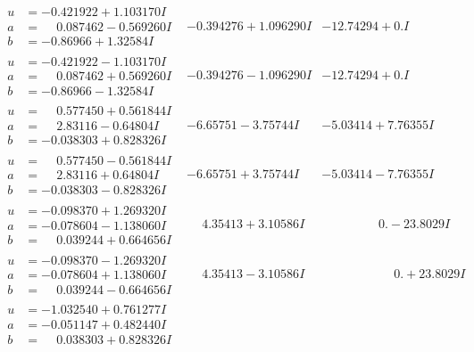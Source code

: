 \documentclass[1p]{elsarticle_modified}
\theoremstyle{definition}
\begin{document}
$$\begin{array}{c|c|c}
\begin{aligned}
u &= -0.421922 + 1.103170 I \\
a &= \phantom{-}0.087462 - 0.569260 I \\
b &= -0.86966 + 1.32584 I\end{aligned}
 & -0.394276 + 1.096290 I & -12.74294 + 0. I\phantom{ +0.000000I} \\ \hline\begin{aligned}
u &= -0.421922 - 1.103170 I \\
a &= \phantom{-}0.087462 + 0.569260 I \\
b &= -0.86966 - 1.32584 I\end{aligned}
 & -0.394276 - 1.096290 I & -12.74294 + 0. I\phantom{ +0.000000I} \\ \hline\begin{aligned}
u &= \phantom{-}0.577450 + 0.561844 I \\
a &= \phantom{-}2.83116 - 0.64804 I \\
b &= -0.038303 + 0.828326 I\end{aligned}
 & -6.65751 - 3.75744 I & -5.03414 + 7.76355 I \\ \hline\begin{aligned}
u &= \phantom{-}0.577450 - 0.561844 I \\
a &= \phantom{-}2.83116 + 0.64804 I \\
b &= -0.038303 - 0.828326 I\end{aligned}
 & -6.65751 + 3.75744 I & -5.03414 - 7.76355 I \\ \hline\begin{aligned}
u &= -0.098370 + 1.269320 I \\
a &= -0.078604 - 1.138060 I \\
b &= \phantom{-}0.039244 + 0.664656 I\end{aligned}
 & \phantom{-}4.35413 + 3.10586 I & \phantom{-0.000000 } 0. - 23.8029 I \\ \hline\begin{aligned}
u &= -0.098370 - 1.269320 I \\
a &= -0.078604 + 1.138060 I \\
b &= \phantom{-}0.039244 - 0.664656 I\end{aligned}
 & \phantom{-}4.35413 - 3.10586 I & \phantom{-0.000000 -}0. + 23.8029 I \\ \hline\begin{aligned}
u &= -1.032540 + 0.761277 I \\
a &= -0.051147 + 0.482440 I \\
b &= \phantom{-}0.038303 + 0.828326 I\end{aligned}

\end{array}$$
\end{document}
